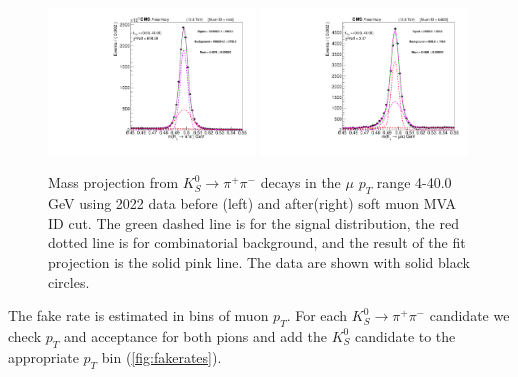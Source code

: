 \begin{figure}[!h]
  \begin{center}
    \includegraphics[width=0.49\textwidth]{figures/chapter4/fakerate/Combined_data_combined_522_2022_ks_trigger_lxy_hv0_Mass_allbin_bla.pdf}
    \includegraphics[width=0.49\textwidth]{figures/chapter4/fakerate/Combined_data_combined_522_2022_ks_trigger_lxy_hv0_Mass_muid_20_allbin_bla.pdf}\\
  \end{center}
  \caption{Mass projection from $K_S^0 \to \pi^+ \pi^-$ decays in the $\mu$
    $p_{T}$ range 4-40.0 GeV using 2022 data before (left) and after(right) soft muon MVA ID cut.
    The green dashed line is for the signal distribution, the red
    dotted line is for combinatorial background, and the result of the
    fit projection is the solid pink line. The data are shown with
    solid black circles.}
  \label{fig:fit_example_pion}
\end{figure}

The fake rate is estimated in bins of muon $p_{T}$. For each $K_S^0 \to \pi^+ \pi^-$ candidate we check $p_{T}$ and acceptance for both pions and add the $K_S^0$ candidate to the appropriate $p_{T}$ bin (\ref{fig:fakerates}).

